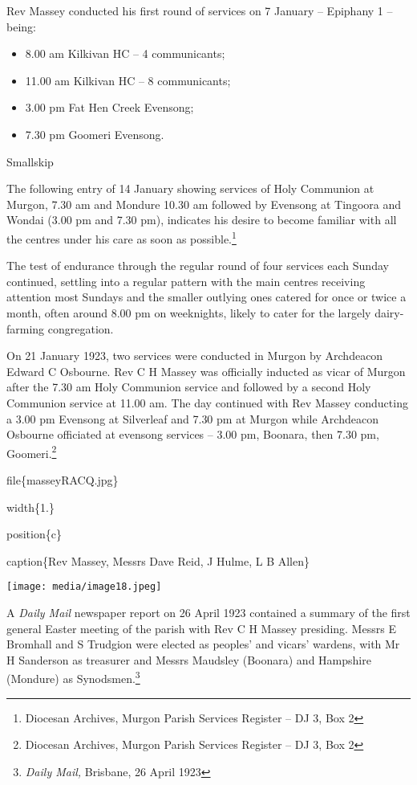 Rev Massey conducted his first round of services on 7 January -- Epiphany 1 -- being:

\begin{itemize}
\item
  8.00 am Kilkivan HC -- 4 communicants;
\item
  11.00 am Kilkivan HC -- 8 communicants;
\item
  3.00 pm Fat Hen Creek Evensong;
\item
  7.30 pm Goomeri Evensong.
\end{itemize}

Smallskip

The following entry of 14 January showing services of Holy Communion at Murgon, 7.30 am and Mondure 10.30 am followed by Evensong at Tingoora and Wondai (3.00 pm and 7.30 pm), indicates his desire to become familiar with all the centres under his care as soon as possible.\footnote{Diocesan Archives, Murgon Parish Services Register -- DJ 3, Box 2}

The test of endurance through the regular round of four services each Sunday continued, settling into a regular pattern with the main centres receiving attention most Sundays and the smaller outlying ones catered for once or twice a month, often around 8.00 pm on weeknights, likely to cater for the largely dairy-farming congregation.

On 21 January 1923, two services were conducted in Murgon by Archdeacon Edward C Osbourne. Rev C H Massey was officially inducted as vicar of Murgon after the 7.30 am Holy Communion service and followed by a second Holy Communion service at 11.00 am. The day continued with Rev Massey conducting a 3.00 pm Evensong at Silverleaf and 7.30 pm at Murgon while Archdeacon Osbourne officiated at evensong services -- 3.00 pm, Boonara, then 7.30 pm, Goomeri.\footnote{Diocesan Archives, Murgon Parish Services Register -- DJ 3, Box 2}

file\{masseyRACQ.jpg\}

width\{1.\}

position\{c\}

caption\{Rev Massey, Messrs Dave Reid, J Hulme, L B Allen\}

\texttt{[image: media/image18.jpeg]}

A \emph{Daily Mail} newspaper report on 26 April 1923 contained a summary of the first general Easter meeting of the parish with Rev C H Massey presiding. Messrs E Bromhall and S Trudgion were elected as peoples' and vicars' wardens, with Mr H Sanderson as treasurer and Messrs Maudsley (Boonara) and Hampshire (Mondure) as Synodsmen.\footnote{\emph{Daily Mail,} Brisbane, 26 April 1923}

